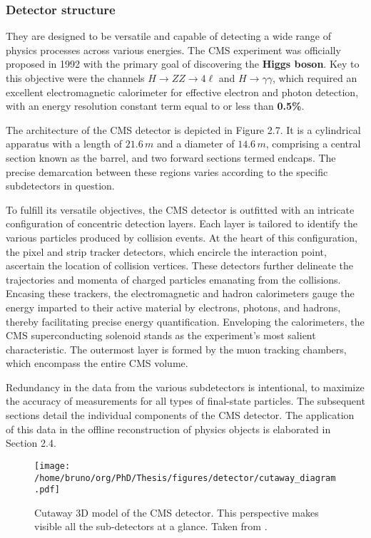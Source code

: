 \documentclass[11pt]{article}
\begin{document}
\subsubsection{Detector structure}
\label{sec:org9a38483}
They are designed to be versatile and capable of detecting a wide range of physics processes across various energies.
The CMS experiment was officially proposed in 1992 with the primary goal of discovering the \textbf{Higgs boson}.
Key to this objective were the channels \(H \rightarrow ZZ \rightarrow 4\ell\) and \(H \rightarrow \gamma\gamma\), which required an excellent electromagnetic calorimeter for effective electron and photon detection, with an energy resolution constant term equal to or less than \textbf{0.5\%}.

The architecture of the CMS detector is depicted in Figure 2.7.
It is a cylindrical apparatus with a length of \(21.6\,m\) and a diameter of \(14.6\,m\), comprising a central section known as the barrel, and two forward sections termed endcaps.
The precise demarcation between these regions varies according to the specific subdetectors in question.

To fulfill its versatile objectives, the CMS detector is outfitted with an intricate configuration of concentric detection layers.
Each layer is tailored to identify the various particles produced by collision events.
At the heart of this configuration, the pixel and strip tracker detectors, which encircle the interaction point, ascertain the location of collision vertices.
These detectors further delineate the trajectories and momenta of charged particles emanating from the collisions.
Encasing these trackers, the electromagnetic and hadron calorimeters gauge the energy imparted to their active material by electrons, photons, and hadrons, thereby facilitating precise energy quantification.
Enveloping the calorimeters, the CMS superconducting solenoid stands as the experiment's most salient characteristic.
The outermost layer is formed by the muon tracking chambers, which encompass the entire CMS volume.

Redundancy in the data from the various subdetectors is intentional, to maximize the accuracy of measurements for all types of final-state particles.
The subsequent sections detail the individual components of the CMS detector.
The application of this data in the offline reconstruction of physics objects is elaborated in Section 2.4.

\begin{figure}
\texttt{[image: /home/bruno/org/PhD/Thesis/figures/detector/cutaway\_diagram.pdf]}
\caption{\label{fig:ggtt_results}Cutaway 3D model of the CMS detector. This perspective makes visible all the sub-detectors at a glance. Taken from \cite{cms_cutaway_diagrams}.}
\end{figure}
\end{document}
